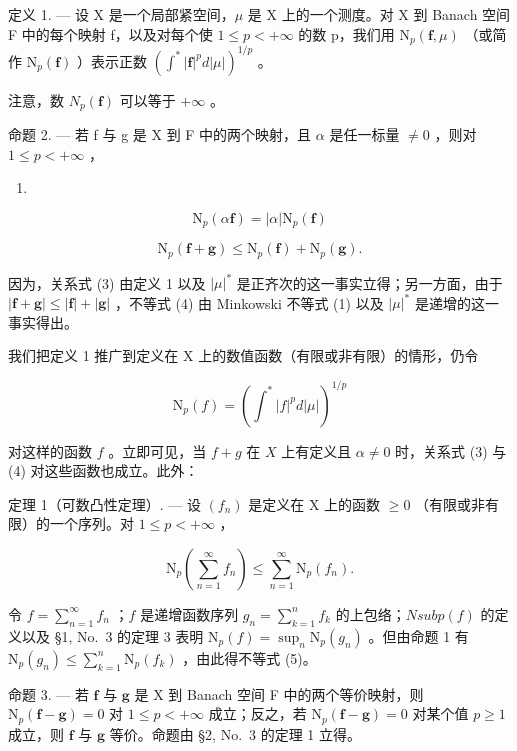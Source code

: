 定义 1. --- 设 X 是一个局部紧空间，\(\mu\) 是 X 上的一个测度。对 X 到 Banach 空间 F 中的每个映射 f，以及对每个使 \(1 \leqslant p < +\infty\) 的数 p，我们用 \(\mathrm{N}_p(\mathbf{f}, \mu)\) （或简作 \(\mathrm{N}_p(\mathbf{f})\) ）表示正数 \((\int^* |\mathbf{f}|^p d|\mu|)^{1/p}\) 。

注意，数 \(N_{p}(\mathbf{f})\) 可以等于 \(+\infty\) 。

命题 2. --- 若 f 与 g 是 X 到 F 中的两个映射，且 \(\alpha\) 是任一标量 \(\neq 0\) ，则对 \(1 \leqslant p < +\infty\) ，

\begin{enumerate}
\def\labelenumi{(\arabic{enumi})}
\setcounter{enumi}{2}
\tightlist
\item
\end{enumerate}

\[
\mathrm{N} _ {p} (\alpha \mathbf {f}) = | \alpha | \mathrm{N} _ {p} (\mathbf {f})\tag{4}
\]

\[
\mathrm{N} _ {p} (\mathbf {f} + \mathbf {g}) \leqslant \mathrm{N} _ {p} (\mathbf {f}) + \mathrm{N} _ {p} (\mathbf {g}).
\]

因为，关系式 (3) 由定义 1 以及 \(|\mu|^*\) 是正齐次的这一事实立得；另一方面，由于 \(|\mathbf{f} + \mathbf{g}| \leqslant |\mathbf{f}| + |\mathbf{g}|\) ，不等式 (4) 由 Minkowski 不等式 (1) 以及 \(|\mu|^*\) 是递增的这一事实得出。

我们把定义 1 推广到定义在 X 上的数值函数（有限或非有限）的情形，仍令

\[
\mathrm{N} _ {p} (f) = \left(\int^ {*} | f | ^ {p} d | \mu |\right) ^ {1 / p}
\]

对这样的函数 \(f\) 。立即可见，当 \(f + g\) 在 \(X\) 上有定义且 \(\alpha \neq 0\) 时，关系式 (3) 与 (4) 对这些函数也成立。此外：

定理 1（可数凸性定理）. --- 设 \((f_n)\) 是定义在 X 上的函数 \(\geqslant 0\) （有限或非有限）的一个序列。对 \(1 \leqslant p < +\infty\) ，

\[
\mathrm{N} _ {p} \left(\sum_ {n = 1} ^ {\infty} f _ {n}\right) \leqslant \sum_ {n = 1} ^ {\infty} \mathrm{N} _ {p} (f _ {n}).\tag{5}
\]

令 \(f = \sum_{n=1}^{\infty} f_n\) ；\(f\) 是递增函数序列 \(g_n = \sum_{k=1}^{n} f_k\) 的上包络；\(N sub p(f)\) 的定义以及 §1, No.~3 的定理 3 表明 \(\mathrm{N}_{p}(f)=\sup_{n}\mathrm{N}_{p}(g_{n})\) 。但由命题 1 有 \(\mathrm{N}_{p}(g_{n})\leqslant\sum_{k=1}^{n}\mathrm{N}_{p}(f_{k})\) ，由此得不等式 (5)。

命题 3. --- 若 \(\mathbf{f}\) 与 \(\mathbf{g}\) 是 X 到 Banach 空间 F 中的两个等价映射，则 \(\mathrm{N}_p(\mathbf{f} - \mathbf{g}) = 0\) 对 \(1 \leqslant p < +\infty\) 成立；反之，若 \(\mathrm{N}_p(\mathbf{f} - \mathbf{g}) = 0\) 对某个值 \(p \geqslant 1\) 成立，则 \(\mathbf{f}\) 与 \(\mathbf{g}\) 等价。命题由 §2, No.~3 的定理 1 立得。

